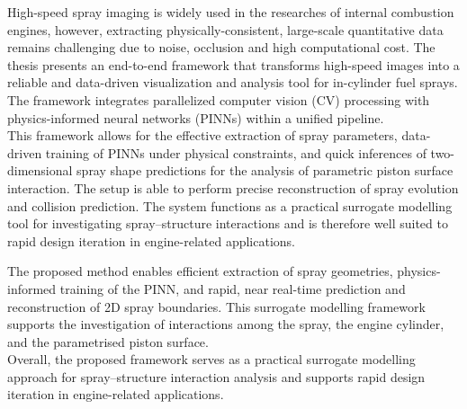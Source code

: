 \documentclass[english, 12pt, a4paper, elec, utf8, a-2b, online]{aaltothesis}
\begin{document}
\begin{abstractpage}[english]

High-speed spray imaging is widely used in the researches of internal combustion engines, however, extracting physically-consistent, large-scale quantitative data remains challenging due to noise, occlusion and high computational cost. The thesis presents an end-to-end framework that transforms high-speed images into a reliable and data-driven visualization and analysis tool for in-cylinder fuel sprays. The framework integrates parallelized computer vision (CV) processing with physics-informed neural networks (PINNs) within a unified pipeline.\\

This framework allows for the effective extraction of spray parameters, data-driven training of PINNs under physical constraints, and quick inferences of two-dimensional spray shape predictions for the analysis of parametric piston surface interaction. The setup is able to perform precise reconstruction of spray evolution and collision prediction. The system functions as a practical surrogate modelling tool for investigating spray–structure interactions and is therefore well suited to rapid design iteration in engine-related applications.





The proposed method enables efficient extraction of spray geometries, physics-informed training of the PINN, and rapid, near real-time prediction and reconstruction of 2D spray boundaries. This surrogate modelling framework supports the investigation of interactions among the spray, the engine cylinder, and the parametrised piston surface. \\ %

Overall, the proposed framework serves as a practical surrogate modelling approach for spray–structure interaction analysis and supports rapid design iteration in engine-related applications.
 

\end{abstractpage}
\end{document}
